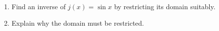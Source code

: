 \begin{enumerate}
\item[(a)] Find an inverse of $j(x)=\sin x$ by restricting its domain suitably.
\item[(b)] Explain why the domain must be restricted.
\end{enumerate}
